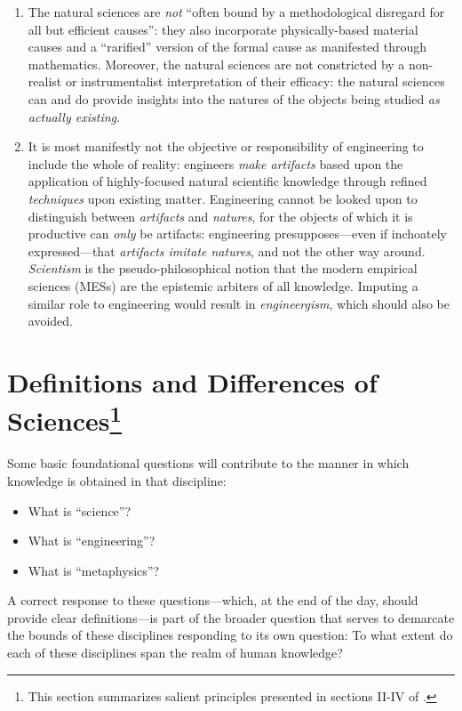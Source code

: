\begin{enumerate}
\item The natural sciences are \textit{not} ``often bound by a methodological disregard for all but efficient causes'': they also incorporate physically-based material causes and a ``rarified'' version of the formal cause as manifested through mathematics. Moreover, the natural sciences are not constricted by a non-realist or instrumentalist interpretation of their efficacy: the natural sciences can and do provide insights into the natures of the objects being studied \textit{as actually existing}.
\item It is most manifestly not the objective or responsibility of engineering to include the whole of reality: engineers \textit{make artifacts} based upon the application of highly-focused natural scientific knowledge through refined \textit{techniques} upon existing matter. Engineering cannot be looked upon to distinguish between \textit{artifacts} and \textit{natures}, for the objects of which it is productive can \textit{only} be artifacts: engineering presupposes---even if inchoately expressed---that \textit{artifacts imitate natures}, and not the other way around. \textit{Scientism} is the pseudo-philosophical notion that the modern empirical sciences (MESs) are the epistemic arbiters of all knowledge. Imputing a similar role to engineering would result in \textit{engineergism}, which should also be avoided.
\end{enumerate}

\section[Definitions and Differences of Sciences]{Definitions and Differences of Sciences\footnote{This section summarizes salient principles presented in sections II-IV of \citet[][pp.~23--167]{adler1978}.}}

Some basic foundational questions will contribute to the manner in which knowledge is obtained in that discipline:

\begin{itemize}
\item What is ``science''?
\item What is ``engineering''?
\item What is ``metaphysics''?
\end{itemize}

A correct response to these questions---which, at the end of the day, should provide clear definitions---is part of the broader question that serves to demarcate the bounds of these disciplines responding to its own question: To what extent do each of these disciplines span the realm of human knowledge?

